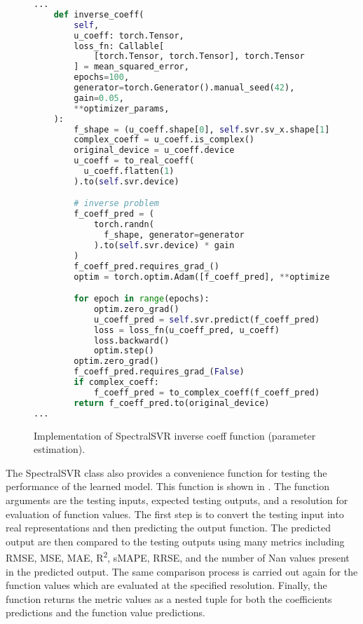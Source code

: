\begin{figure}[H]
  \centering
  \begin{lstlisting}[language=Python]
...
    def inverse_coeff(
        self,
        u_coeff: torch.Tensor,
        loss_fn: Callable[
            [torch.Tensor, torch.Tensor], torch.Tensor
        ] = mean_squared_error,
        epochs=100,
        generator=torch.Generator().manual_seed(42),
        gain=0.05,
        **optimizer_params,
    ):
        f_shape = (u_coeff.shape[0], self.svr.sv_x.shape[1])
        complex_coeff = u_coeff.is_complex()
        original_device = u_coeff.device
        u_coeff = to_real_coeff(
          u_coeff.flatten(1)
        ).to(self.svr.device)

        # inverse problem
        f_coeff_pred = (
            torch.randn(
              f_shape, generator=generator
            ).to(self.svr.device) * gain
        )
        f_coeff_pred.requires_grad_()
        optim = torch.optim.Adam([f_coeff_pred], **optimizer_params)

        for epoch in range(epochs):
            optim.zero_grad()
            u_coeff_pred = self.svr.predict(f_coeff_pred)
            loss = loss_fn(u_coeff_pred, u_coeff)
            loss.backward()
            optim.step()
        optim.zero_grad()
        f_coeff_pred.requires_grad_(False)
        if complex_coeff:
            f_coeff_pred = to_complex_coeff(f_coeff_pred)
        return f_coeff_pred.to(original_device)
...
  \end{lstlisting}
  \caption{Implementation of SpectralSVR inverse coeff function (parameter estimation).}\label{fig:spectralsvr_inverse_impl}
\end{figure}

The SpectralSVR class also provides a convenience function for testing the performance of the learned model. This function is shown in . The function arguments are the testing inputs, expected testing outputs, and a resolution for evaluation of function values. The first step is to convert the testing input into real representations and then predicting the output function. The predicted output are then compared to the testing outputs using many metrics including RMSE, MSE, MAE, R\textsuperscript{2}, sMAPE, RRSE, and the number of Nan values present in the predicted output. The same comparison process is carried out again for the function values which are evaluated at the specified resolution. Finally, the function returns the metric values as a nested tuple for both the coefficients predictions and the function value predictions.

